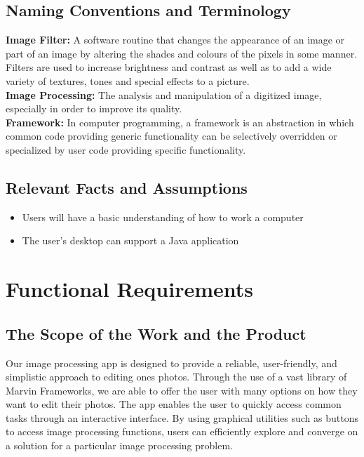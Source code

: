 \documentclass[12pt, titlepage]{article}
\begin{document}
\subsection{Naming Conventions and Terminology}

{\bf Image Filter:} A software routine that changes the appearance of an image or part of an image by altering the shades and colours of the pixels in some manner. Filters are used to increase brightness and contrast as well as to add a wide variety of textures, tones and special effects to a picture.\\

{\bf Image Processing:} The analysis and manipulation of a digitized image, especially in order to improve its quality.\\

{\bf Framework:} In computer programming, a framework is an abstraction in which common code providing generic functionality can be selectively overridden or specialized by user code providing specific functionality.


\subsection{Relevant Facts and Assumptions}

\begin{itemize}
  \item Users will have a basic understanding of how to work a computer
  \item The user's desktop can support a Java application
\end{itemize}


\newpage

\section{Functional Requirements}


\subsection{The Scope of the Work and the Product}

Our image processing app is designed to provide a reliable, user-friendly, and simplistic approach to editing ones photos. Through the use of a vast library of Marvin Frameworks, we are able to offer the user with many options on how they want to edit their photos. The app enables the user to quickly access common tasks through an interactive interface. By using graphical utilities such as buttons to access image processing functions, users can efficiently explore and converge on a solution for a particular image processing problem.
\end{document}
